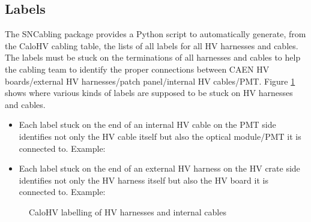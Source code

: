 \subsection{Labels}

The  SNCabling  package  provides  a Python  script  to  automatically
generate, from the  CaloHV cabling table, the lists of  all labels for
all  HV  harnesses and  cables.   The  labels  must  be stuck  on  the
terminations of all  harnesses and cables to help the  cabling team to
identify  the proper  connections between  CAEN HV  boards/external HV
harnesses/patch     panel/internal      HV     cables/PMT.      Figure
\ref{fig:calohv:labels:1}  shows where  various  kinds  of labels  are
supposed to be stuck on HV harnesses and cables.

\begin{itemize}
\item Each label  stuck on the end of an  internal HV cable on
the PMT  side identifies  not only  the HV cable  itself but  also the
optical module/PMT it is connected to. Example:
  \begin{center}
  \end{center}
\item Each label  stuck on the end of an  external HV harness on
the HV crate  side identifies  not only  the HV harness  itself but  also the
HV board it is connected to. Example:
  \begin{center}
  \end{center}
\end{itemize}

\begin{figure}[h!]
  \begin{center}
    \scalebox{0.75}{}
  \end{center}
  \caption{CaloHV labelling of HV harnesses and internal cables}
  \label{fig:calohv:labels:1}
\end{figure}

